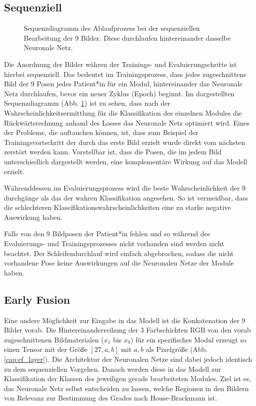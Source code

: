 \subsection{Sequenziell}\label{sequential_method}
\begin{figure}[!b]\centering
\makebox[0pt]{}
\caption[Sequenzdiagramm des Ablaufprozess bei der sequenziellen Bearbeitung der 9 Bilder]{Sequenzdiagramm des Ablaufprozess bei der sequenziellen Bearbeitung der 9 Bilder. Diese durchlaufen hintereinander dasselbe Neuronale Netz.}\label{cap:seq}
\end{figure}\label{fig:seq}

Die Anordnung der Bilder währen der Trainings- und Evaluierungschritte ist hierbei sequenziell. Das bedeutet im Trainingsprozess, dass jedes zugeschnittene Bild der 9 Posen jedes Patient*in für ein Modul, hintereinander das Neuronale Netz durchlaufen, bevor ein neuer Zyklus (Epoch) beginnt. Im dargestellten Sequenzdiagramm (Abb. \ref{cap:seq}) ist zu sehen, dass nach der Wahrscheinlichkeitsermittlung für die Klassifikation des einzelnen Modules die Rückwärtsrechnung anhand des Losses das Neuronale Netz optimiert wird. Eines der Probleme, die auftauchen können, ist, dass zum Beispiel der Trainingsvortschritt der durch das erste Bild erzielt wurde direkt vom nächsten zerstört werden kann. Vorstellbar ist, dass die Posen, die im jedem Bild unterschiedlich dargestellt werden, eine komplementäre Wirkung auf das Modell erzielt.

Währenddessen im Evaluierungsprozess wird die beste Wahrscheinlichkeit der 9 durchgänge als das der wahren Klassifikation angesehen. So ist vermeidbar, dass die schlechteren Klassifikationswahrscheinlichkeiten eine zu starke negative Auswirkung haben.

Falls von den 9 Bildposen der Patient*in fehlen und so während des Evaluierungs- und Trainingsprozesses nicht vorhanden sind werden nicht beachtet. Der Schleifendurchlauf wird einfach abgebrochen, sodass die nicht vorhandene Pose keine Auswirkungen auf die Neuronalen Netze der Module haben.


\subsection{Early Fusion}\label{earlyfusion_method}
Eine andere Möglichkeit zur Eingabe in das Modell ist die Konkatenation der 9 Bilder vorab. Die Hintereinanderreihung der 3 Farbschichten RGB von den vorab zugeschnittenen Bildmaterialen ($x_1$ bis $x_9$) für ein spezifisches Modul erzeugt so einen Tensor mit der Größe $[27, a, b]$ mit $a, b$ als Pixelgröße (Abb. \ref{cap:ef_layer}). Die Architektur der Neuronalen Netze sind dabei jedoch identisch zu dem sequenziellen Vorgehen. Danach werden diese in das Modell zur Klassifikation der Klassen des jeweiligen gerade bearbeiteten Modules. Ziel ist es, das Neuronale Netz selbst entscheiden zu lassen, welche Regionen in den Bildern von Relevanz zur Bestimmung des Grades nach House-Brackmann ist.

